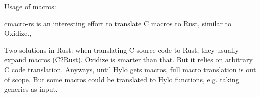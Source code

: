 Usage of macros: \cite{usage-of-macros-study}

cmacro-rs is an interesting effort to translate C macros to Rust, similar to Oxidize.,

Two solutions in Rust: when translating C source code to Rust, they usually expand macros (C2Rust). Oxidize is smarter than that. But it relies on arbitrary C code translation. Anyways, until Hylo gets macros, full macro translation is out of scope. But some macros could be translated to Hylo functions, e.g. taking generics as input. 


